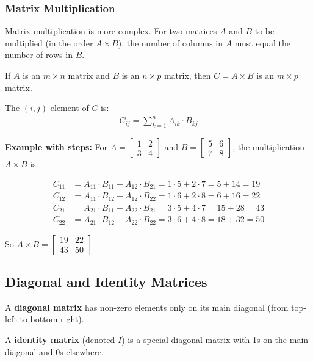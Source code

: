 \documentclass{article}
\begin{document}
\subsubsection{Matrix Multiplication}
Matrix multiplication is more complex. For two matrices $A$ and $B$ to be multiplied (in the order $A \times B$), the number of columns in $A$ must equal the number of rows in $B$.

If $A$ is an $m \times n$ matrix and $B$ is an $n \times p$ matrix, then $C = A \times B$ is an $m \times p$ matrix.

The $(i,j)$ element of $C$ is:
\begin{align}
C_{ij} = \sum_{k=1}^{n} A_{ik} \cdot B_{kj}
\end{align}

\textbf{Example with steps:}
For $A = \begin{bmatrix} 1 & 2 \\ 3 & 4 \end{bmatrix}$ and $B = \begin{bmatrix} 5 & 6 \\ 7 & 8 \end{bmatrix}$, the multiplication $A \times B$ is:

\begin{align}
C_{11} &= A_{11} \cdot B_{11} + A_{12} \cdot B_{21} = 1 \cdot 5 + 2 \cdot 7 = 5 + 14 = 19\\
C_{12} &= A_{11} \cdot B_{12} + A_{12} \cdot B_{22} = 1 \cdot 6 + 2 \cdot 8 = 6 + 16 = 22\\
C_{21} &= A_{21} \cdot B_{11} + A_{22} \cdot B_{21} = 3 \cdot 5 + 4 \cdot 7 = 15 + 28 = 43\\
C_{22} &= A_{21} \cdot B_{12} + A_{22} \cdot B_{22} = 3 \cdot 6 + 4 \cdot 8 = 18 + 32 = 50
\end{align}

So $A \times B = \begin{bmatrix} 19 & 22 \\ 43 & 50 \end{bmatrix}$

\subsection{Diagonal and Identity Matrices}

A \textbf{diagonal matrix} has non-zero elements only on its main diagonal (from top-left to bottom-right).

A \textbf{identity matrix} (denoted $I$) is a special diagonal matrix with 1s on the main diagonal and 0s elsewhere.
\end{document}
